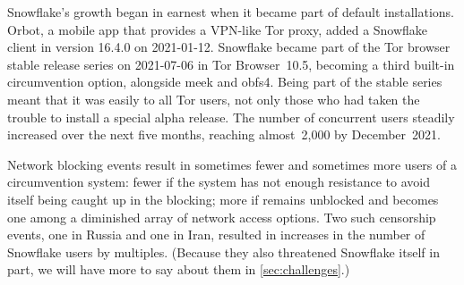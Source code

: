 \documentclass[letterpaper,twocolumn]{article}
\begin{document}
Snowflake's growth began in earnest
when it became part of default installations.
Orbot, a mobile app that provides a VPN-like Tor proxy,
added a Snowflake client in version 16.4.0
on \mbox{2021-01-12}.
Snowflake became part of the Tor browser stable release series
on \mbox{2021-07-06} in Tor Browser~10.5,
becoming a third built-in circumvention option,
alongside meek and obfs4.
Being part of the stable series meant that it was
easily to all Tor users,
not only those who had taken the trouble to install a special alpha release.
The number of concurrent users steadily increased
over the next five months,
reaching almost~2,000 by December~2021.

Network blocking events result in sometimes fewer and
sometimes more users of a circumvention system:
fewer if the system has not enough resistance to avoid
itself being caught up in the blocking;
more if remains unblocked and becomes one
among a diminished array of network access options.
Two such censorship events,
one in Russia and one in Iran,
resulted in increases in the number of Snowflake users
by multiples.
(Because they also threatened Snowflake itself in part,
we will have more to say about them in \autoref{sec:challenges}.)
\end{document}
